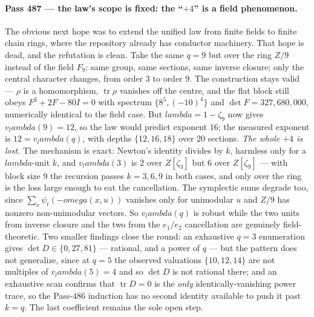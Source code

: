 \documentclass[12pt,a4paper]{article}
\def\mathbb#1{#1}%
\def\textbf#1{#1}%
\def\omega{omega}%
\def\lambda{lambda}%
\theoremstyle{definition}
\newcommand{\FF}{\mathbb{F}}
\newcommand{\ZZ}{\mathbb{Z}}
\begin{document}
\paragraph{Pass 487 --- the law's scope is fixed: the ``$+4$'' is a field
phenomenon.}
The obvious next hope was to extend the unified law from finite fields to
finite chain rings, where the repository already has conductor machinery.
\textbf{That hope is dead, and the refutation is clean.}  Take the same $q=9$
but over the ring $\ZZ/9$ instead of the field $\FF_9$: same group, same
sections, same inverse closure; only the central character changes, from order
$3$ to order $9$.  The construction stays valid --- $\rho$ is a homomorphism,
$\operatorname{tr}\rho$ vanishes off the centre, and the flat block still obeys
$F^2+2F-80I=0$ with spectrum $\{8^5,(-10)^4\}$ and $\det F=327{,}680{,}000$,
numerically identical to the field case.  But $\lambda=1-\zeta_9$ now gives
$v_\lambda(9)=12$, so the law would predict exponent $16$; the measured
exponent is $12=v_\lambda(q)$, with depths $\{12,16,18\}$ over $20$ sections.
\emph{The whole $+4$ is lost.}  The mechanism is exact: Newton's identity
divides by $k$, harmless only for a $\lambda$-unit $k$, and $v_\lambda(3)$ is
$2$ over $\ZZ[\zeta_3]$ but $6$ over $\ZZ[\zeta_9]$ --- with block size $9$ the
recursion passes $k=3,6,9$ in both cases, and only over the ring is the loss
large enough to eat the cancellation.  The symplectic sums degrade too, since
$\sum_x\psi_t(-\omega(x,u))$ vanishes only for unimodular $u$ and $\ZZ/9$ has
nonzero non-unimodular vectors.  So $v_\lambda(q)$ is robust while the two
units from inverse closure and the two from the $e_1/e_2$ cancellation are
genuinely field-theoretic.  Two smaller findings close the round: an exhaustive
$q=3$ enumeration gives $\det D\in\{0,27,81\}$ --- rational, and a power of
$q$ --- but the pattern does not generalize, since at $q=5$ the observed
valuations $\{10,12,14\}$ are not multiples of $v_\lambda(5)=4$ and so
$\det D$ is not rational there; and an exhaustive scan confirms that
$\operatorname{tr}D=0$ is the \emph{only} identically-vanishing power trace, so
the Pass-486 induction has no second identity available to push it past
$k=q$.  The last coefficient remains the sole open step.
\end{document}
